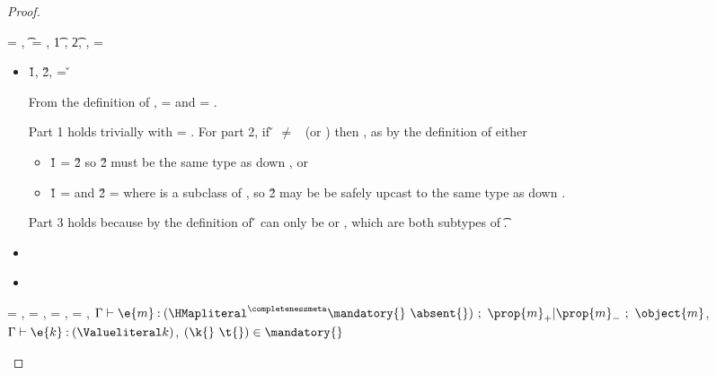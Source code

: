 \begin{lemma}
\begin{enumerate}
\begin{proof}
\begin{case}[T-IsA]\e{} = { {}},
  \t{} = {\Boolean{}},
  \judgement {\propenv{}} { {\t{1}}}
             {\filterset {\thenprop {\propp{}}}
                         {\elseprop {\propp{}}}}
                       {},
  \judgementtwo {\propenv{}} { {\t{2}}},
  ,
  \object{} = \emptyobject{}

  \begin{itemize}
    \item[]
      \begin{subcase}[B-IsA]
  \opsem {\openv{}} {} {\v{1}},
  \opsem {\openv{}} {} {\v{2}},
   = {\v{}}

  From the definition of \isacompareliteral,
  \thenprop{\prop{}} = {} and
  \elseprop{\prop{}} = {}.

  Part 1 holds trivially with \object{} = \emptyobject{}.
  For part 2, if \v{} $\not=$ \false\ (or \nil)
  then {}, as by the definition
  of \isaopsemliteral either 
  \begin{itemize}
    \item \v{1} = \v{2} so {\v{2}} must be the same type as down {}, or
    \item \v{1} =  and \v{2} =  where 
  is a subclass of , so {\v{2}} may be be safely upcast to the same type as down {}.
  \end{itemize}
  Part 3 holds because by the definition of \isaopsemliteral
  \v{} can only be \true or \false, which are both subtypes of
  \t{}.


      \end{subcase}
    \item[]
      \begin{subcase}[BE-IsA1]
      \end{subcase}
    \item[]
      \begin{subcase}[BE-IsA2]
      \end{subcase}
  \end{itemize}
\end{case}

\begin{case}[T-GetHMap]
  \e{} = { {}},
  \thenprop{\prop{}} = {\topprop{}},
  \elseprop{\prop{}} = {\topprop{}},
  \object{} = {
                          {}
                          {\x{}}},
  $\judgement {\propenv{}} {\hastype {\e{m}} {\HMapgeneric {\mandatory{}} {\absent{}}}}
           {\filterset {\thenprop {\prop{m}}} {\elseprop {\prop{m}}}}
           {\object{m}}$,
  $\judgementtwo {\propenv{}} {\hastype {\e{k}} {\Value {k}}}$,
             ${\inmandatory{\k{}}{\t{}}{\mandatory{}}}$



\end{case}
\end{proof}
\end{enumerate}
\end{lemma}
